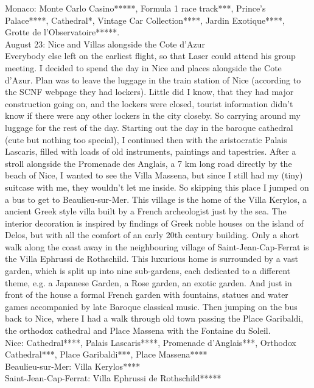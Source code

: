 Monaco: Monte Carlo Casino*****, Formula 1 race track***, Prince's Palace****, Cathedral*, Vintage Car Collection****, Jardin Exotique****, Grotte de l'Observatoire*****.\\

August 23: Nice and Villas alongside the Cote d'Azur\\
Everybody else left on the earliest flight, so that Laser could attend his group meeting. I decided to spend the day in Nice and places alongside the Cote d'Azur. Plan was to leave the luggage in the train station of Nice (according to the SCNF webpage they had lockers). Little did I know, that they had major construction going on, and the lockers were closed, tourist information didn't know if there were any other lockers in the city closeby. So carrying around my luggage for the rest of the day. Starting out the day in the baroque cathedral (cute but nothing too special), I continued then with the aristocratic Palais Lascaris, filled with loads of old instruments, paintings and tapestries. After a stroll alongside the Promenade des Anglais, a 7 km long road directly by the beach of Nice, I wanted to see the Villa Massena, but since I still had my (tiny) suitcase with me, they wouldn't let me inside. So skipping this place I jumped on a bus to get to Beaulieu-sur-Mer. This village is the home of the Villa Kerylos, a ancient Greek style villa built by a French archeologist just by the sea. The interior decoration is inspired by findings of Greek noble houses on the island of Delos, but with all the comfort of an early 20th century building. Only a short walk along the coast away in the neighbouring village of Saint-Jean-Cap-Ferrat is the Villa Ephrussi de Rothschild. This luxurious home is surrounded by a vast garden, which is split up into nine sub-gardens, each dedicated to a different theme, e.g. a Japanese Garden, a Rose garden, an exotic garden. And just in front of the house a formal French garden with fountains, statues and water games accompanied by late Baroque classical music. Then jumping on the bus back to Nice, where I had a walk through old town passing the Place Garibaldi, the orthodox cathedral and Place Massena with the Fontaine du Soleil.\\

Nice: Cathedral****, Palais Lascaris****, Promenade d'Anglais***, Orthodox Cathedral***, Place Garibaldi***, Place Massena****\\
Beaulieu-sur-Mer: Villa Kerylos****\\
Saint-Jean-Cap-Ferrat: Villa Ephrussi de Rothschild*****

